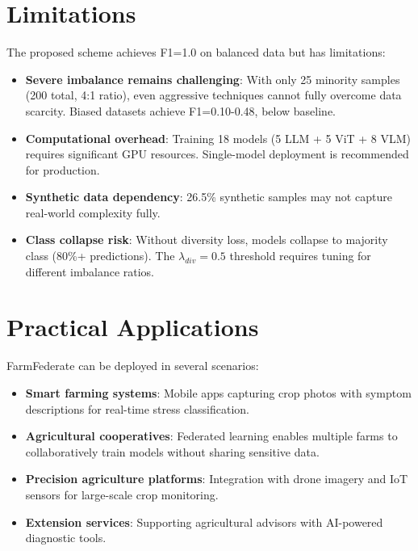 \documentclass[journal]{IEEEtran}
\begin{document}
\section{Limitations}

The proposed scheme achieves F1=1.0 on balanced data but has limitations:

\begin{itemize}
    \item \textbf{Severe imbalance remains challenging}: With only 25 minority samples (200 total, 4:1 ratio), even aggressive techniques cannot fully overcome data scarcity. Biased datasets achieve F1=0.10-0.48, below baseline.

    \item \textbf{Computational overhead}: Training 18 models (5 LLM + 5 ViT + 8 VLM) requires significant GPU resources. Single-model deployment is recommended for production.

    \item \textbf{Synthetic data dependency}: 26.5\% synthetic samples may not capture real-world complexity fully.

    \item \textbf{Class collapse risk}: Without diversity loss, models collapse to majority class (80\%+ predictions). The $\lambda_{div}=0.5$ threshold requires tuning for different imbalance ratios.
\end{itemize}

\section{Practical Applications}

FarmFederate can be deployed in several scenarios:

\begin{itemize}
    \item \textbf{Smart farming systems}: Mobile apps capturing crop photos with symptom descriptions for real-time stress classification.

    \item \textbf{Agricultural cooperatives}: Federated learning enables multiple farms to collaboratively train models without sharing sensitive data.

    \item \textbf{Precision agriculture platforms}: Integration with drone imagery and IoT sensors for large-scale crop monitoring.

    \item \textbf{Extension services}: Supporting agricultural advisors with AI-powered diagnostic tools.
\end{itemize}
\end{document}
